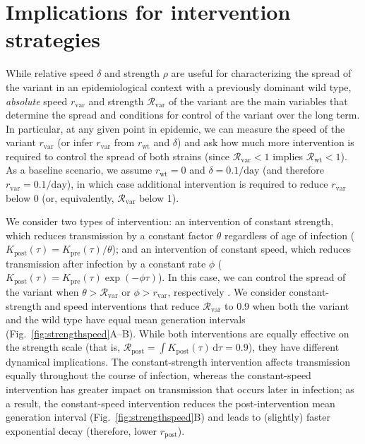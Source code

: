 \documentclass[12pt]{article}
\newcommand{\fref}[1]{Fig.~\ref{fig:#1}}
\newcommand{\vvvar}{\mathrm{var}}
\newcommand{\wwwt}{\mathrm{wt}}
\newcommand{\rx}[1]{\ensuremath{{r}_{#1}}\xspace}
\newcommand{\ry}[1]{\rx{\mathrm{#1}}}
\newcommand{\rw}{\rx{\wwwt}}
\newcommand{\rv}{\rx{\vvvar}}
\newcommand{\Rx}[1]{\ensuremath{{\mathcal R}_{#1}}\xspace}
\newcommand{\Ry}[1]{\Rx{\mathrm{#1}}}
\newcommand{\Rw}{\Rx{\wwwt}}
\newcommand{\Rv}{\Rx{\vvvar}}
\newcommand{\pday}{\ensuremath{/\textrm{day}}}
\newcommand{\dd}[1]{\ensuremath{\, \mathrm{d}#1}}
\newcommand{\dtau}{\dd{\tau}}
\begin{document}
\section{Implications for intervention strategies}

While relative speed $\delta$ and strength $\rho$ are useful for characterizing the spread of the variant in an epidemiological context with a previously dominant wild type, \emph{absolute} speed $\rv$ and strength $\Rv$ of the variant are the main variables that determine the spread and conditions for control of the variant over the long term.
In particular, at any given point in epidemic, we can measure the speed of the variant $\rv$ (or infer $\rv$ from $\rw$ and $\delta$) and ask how much more intervention is required to control the spread of both strains (since $\Rv < 1$ implies $\Rw < 1$).
As a baseline scenario, we assume $\rw=0$ and $\delta=0.1\pday$ (and therefore $\rv=0.1\pday$), in which case additional intervention is required to reduce $\rv$ below 0 (or, equivalently, $\Rv$ below 1).

We consider two types of intervention:
an intervention of constant strength, which reduces transmission by a constant factor $\theta$ regardless of age of infection ($K_{\mathrm{post}}(\tau) = K_{\mathrm{pre}}(\tau)/\theta$); and an intervention of constant speed, which reduces transmission after infection by a constant rate $\phi$ ($K_{\mathrm{post}}(\tau) = K_{\mathrm{pre}}(\tau) \exp(-\phi \tau)$).
In this case, we can control the spread of the variant when $\theta > \Rv$ or $\phi > \rv$, respectively \citep{doi:10.1098/rspb.2020.1556}.
We consider constant-strength and speed interventions that reduce $\Rv$ to 0.9 when both the variant and the wild type have equal mean generation intervals (\fref{strengthspeed}A--B).
While both interventions are equally effective on the strength scale (that is, $\Ry{post}=\int  K_{\mathrm{post}}(\tau) \dtau = 0.9$), they have different dynamical implications.
The constant-strength intervention affects transmission equally throughout the course of infection, whereas the constant-speed intervention has greater impact on transmission that occurs later in infection;
as a result, the constant-speed intervention reduces the post-intervention mean generation interval (\fref{strengthspeed}B) and leads to (slightly) faster exponential decay (therefore, lower $\ry{post}$).
\end{document}
